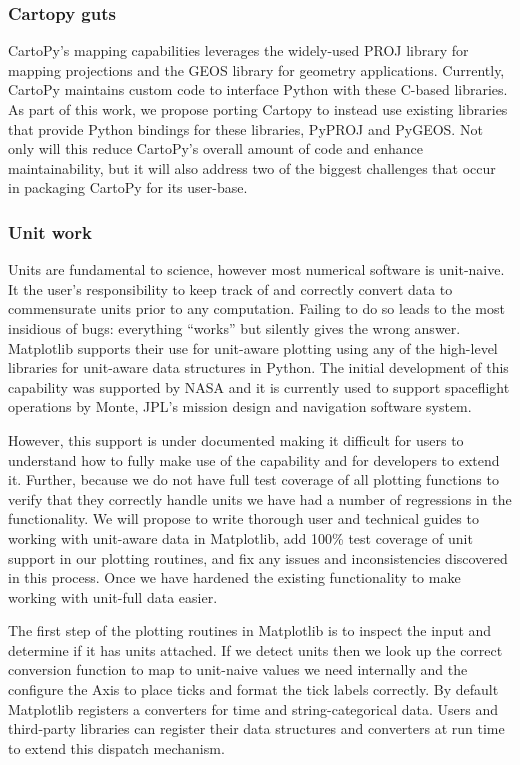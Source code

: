 \documentclass[12pt]{article}
\numberwithin{page}{section}
\begin{document}
\subsubsection{Cartopy guts}
CartoPy's mapping capabilities leverages the widely-used PROJ library
for mapping projections and the GEOS library for geometry
applications. Currently, CartoPy maintains custom code to interface
Python with these C-based libraries. As part of this work, we propose
porting Cartopy to instead use existing libraries that provide Python
bindings for these libraries, PyPROJ and PyGEOS. Not only will this
reduce CartoPy's overall amount of code and enhance maintainability,
but it will also address two of the biggest challenges that occur in
packaging CartoPy for its user-base.


\subsubsection{Unit work}

Units are fundamental to science, however most numerical software is
unit-naive.  It the user's responsibility to keep track of and
correctly convert data to commensurate units prior to any computation.
Failing to do so leads to the most insidious of bugs: everything
``works'' but silently gives the wrong answer.  Matplotlib supports
their use for unit-aware plotting using any of the high-level
libraries for unit-aware data structures in Python.  The initial
development of this capability was supported by NASA and it is
currently used to support spaceflight operations by Monte, JPL's
mission design and navigation software system.

However, this support is under documented making it difficult for
users to understand how to fully make use of the capability and for
developers to extend it.  Further, because we do not have full test
coverage of all plotting functions to verify that they correctly
handle units we have had a number of regressions in the functionality.
We will propose to write thorough user and technical guides to working
with unit-aware data in Matplotlib, add 100\% test coverage of unit
support in our plotting routines, and fix any issues and
inconsistencies discovered in this process.  Once we have hardened the
existing functionality to make working with unit-full data easier.

The first step of the plotting routines in Matplotlib is to inspect
the input and determine if it has units attached.  If we detect units
then we look up the correct conversion function to map to unit-naive
values we need internally and the configure the Axis to place ticks
and format the tick labels correctly.  By default Matplotlib registers
a converters for time and string-categorical data. Users and
third-party libraries can register their data structures and
converters at run time to extend this dispatch mechanism.
\end{document}
